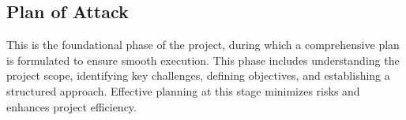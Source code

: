 \documentclass{article}
\begin{document}
%
\subsection{Plan of Attack}
This is the foundational phase of the project, during which a comprehensive plan is formulated to ensure smooth execution.
This phase includes understanding the project scope, identifying key challenges, defining objectives, and establishing a structured approach.
Effective planning at this stage minimizes risks and enhances project efficiency.
\end{document}
